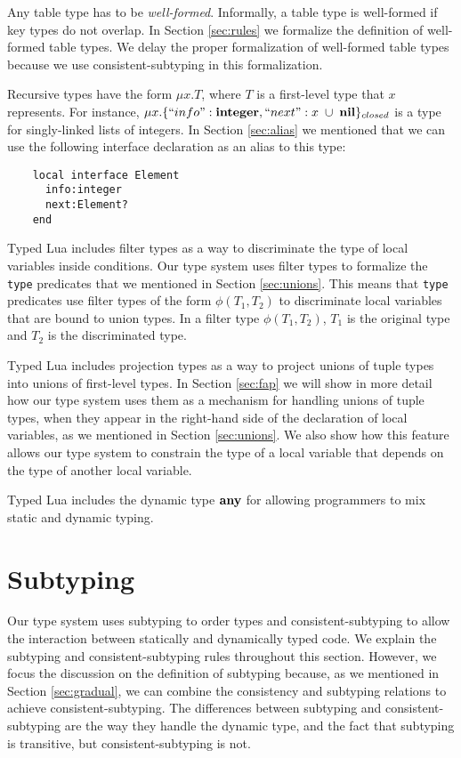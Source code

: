 Any table type has to be \emph{well-formed}.
Informally, a table type is well-formed if key types do not overlap.
In Section \ref{sec:rules} we formalize the definition of well-formed table types.
We delay the proper formalization of well-formed table types because we use
consistent-subtyping in this formalization.

Recursive types have the form $\mu x.T$,
where $T$ is a first-level type that $x$ represents.
For instance, $\mu x.\{``info":\mathbf{integer}, ``next":x \;\cup\; \mathbf{nil}\}_{closed}$
is a type for singly-linked lists of integers.
In Section \ref{sec:alias} we mentioned that we can use the following
interface declaration as an alias to this type:
\begin{verbatim}
    local interface Element
      info:integer
      next:Element?
    end
\end{verbatim}

Typed Lua includes filter types as a way to discriminate the type of local
variables inside conditions.
Our type system uses filter types to formalize the \texttt{type} predicates
that we mentioned in Section \ref{sec:unions}.
This means that \texttt{type} predicates use filter types of the form
$\phi(T_{1},T_{2})$ to discriminate local variables that are bound to
union types.
In a filter type $\phi(T_{1},T_{2})$, $T_{1}$ is the original type and
$T_{2}$ is the discriminated type.

Typed Lua includes projection types as a way to project
unions of tuple types into unions of first-level types.
In Section \ref{sec:fap} we will show in more detail how our type system
uses them as a mechanism for handling unions of tuple types,
when they appear in the right-hand side of the declaration of local variables,
as we mentioned in Section \ref{sec:unions}.
We also show how this feature allows our type system to constrain
the type of a local variable that depends on the type of another local variable.

Typed Lua includes the dynamic type $\mathbf{any}$ for allowing programmers
to mix static and dynamic typing.

\section{Subtyping}
\label{sec:subtyping}

Our type system uses subtyping \citep{cardelli1984smi,abadi1996to} to order
types and consistent-subtyping \citep{siek2007objects,siek2013mutable}
to allow the interaction between statically and dynamically typed code.
We explain the subtyping and consistent-subtyping rules throughout this section.
However, we focus the discussion on the definition of subtyping because,
as we mentioned in Section \ref{sec:gradual}, we can combine the
consistency and subtyping relations to achieve consistent-subtyping.
The differences between subtyping and consistent-subtyping are the way
they handle the dynamic type, and the fact that subtyping is transitive,
but consistent-subtyping is not.

